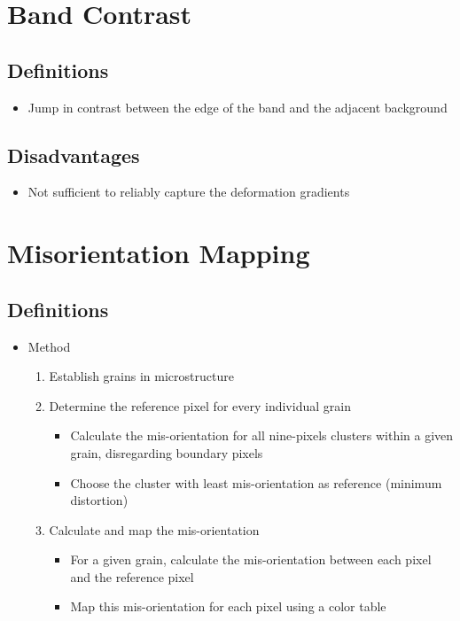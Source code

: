 \documentclass[letterpaper]{article}
\begin{document}
\newpage
	\section{Band Contrast}
		\subsection{Definitions}
			\begin{itemize}
				\item Jump in contrast between the edge of the band and the adjacent background \cite{Brewer2006}
			\end{itemize}
		
		\subsection{Disadvantages}
			\begin{itemize}
				\item Not sufficient to reliably capture the deformation gradients \cite{Brewer2006}
			\end{itemize}

\newpage
	\section{Misorientation Mapping}
		\subsection{Definitions}
			\begin{itemize}
				\item Method \cite{Brewer2006}
					\begin{enumerate}
						\item Establish grains in microstructure
						\item Determine the reference pixel for every individual grain
							\begin{itemize}
								\item Calculate the mis-orientation for all nine-pixels clusters within a given grain, disregarding boundary pixels
								\item Choose the cluster with least mis-orientation as reference (minimum distortion)
							\end{itemize}
						\item Calculate and map the mis-orientation
							\begin{itemize}
								\item For a given grain, calculate the mis-orientation between each pixel and the reference pixel
								\item Map this mis-orientation for each pixel using a color table
							\end{itemize}
					\end{enumerate}
			\end{itemize}
	
\end{document}
